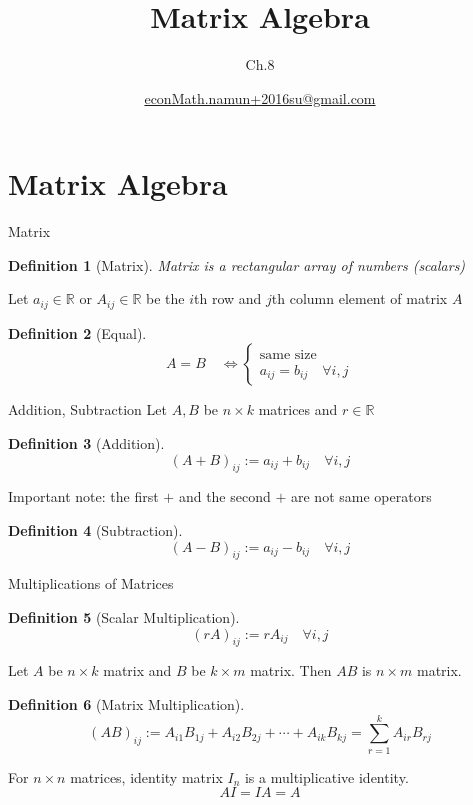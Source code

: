 \documentclass[final]{beamer}
\author[조남운]{\url{econMath.namun+2016su@gmail.com}}
\title{Matrix Algebra}
\subtitle{Ch.8}
\newtheorem{defn}{Definition}
\begin{document}
	
\maketitle


\section{Matrix Algebra} %
\label{sec:matrix_algebra}
\begin{frame}[t]{Matrix}
	\begin{defn}
		[Matrix]
		Matrix is a rectangular array of numbers (scalars)
	\end{defn}
	
	Let $a_{ij}\in \mathbb{R}$ or $A_{ij}\in\mathbb{R}$ be the $i$th row and $j$th column element of matrix $A$
	
	\begin{defn}
		[Equal]
		\[
			A=B\quad \iff \begin{cases}
				\text{same size}\\
				a_{ij}=b_{ij} \quad \forall i,j
			\end{cases}
		\]
	\end{defn}
	
\end{frame}

\begin{frame}[t]{Addition, Subtraction}
	Let $A,B$ be $n\times k$ matrices and $r\in \mathbb{R}$
	\begin{defn}
		[Addition]
		\[
			(A+B)_{ij} := a_{ij}+b_{ij}\quad\forall i,j
		\]
	\end{defn}
	Important note: the first $+$ and the second $+$ are not same operators
	
	\begin{defn}
		[Subtraction]
		\[
			(A-B)_{ij} := a_{ij}-b_{ij}\quad\forall i,j
		\]
	\end{defn}
\end{frame}

\begin{frame}[t]{Multiplications of Matrices}
	\begin{defn}
		[Scalar Multiplication]
		\[
			(rA)_{ij} := r A_{ij}\quad\forall i,j
		\]
	\end{defn}
	Let $A$ be $n\times k$ matrix and $B$ be $k\times m$ matrix. Then $AB$ is $n\times m$ matrix.
	\begin{defn}
		[Matrix Multiplication]
		\[
			(AB)_{ij}:=A_{i1}B_{1j}+A_{i2}B_{2j}+\cdots+A_{ik}B_{kj}= \sum_{r=1}^k A_{ir}B_{rj}
		\]
	\end{defn}
	For $n\times n$ matrices, identity matrix $I_n$ is a multiplicative identity. 
	\[
		AI = IA = A
	\]
\end{frame}
\end{document}
